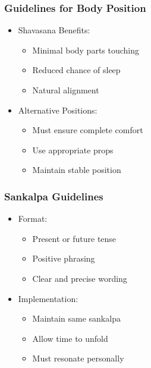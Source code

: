 \begin{frame}[fragile]\frametitle{Guidelines for Body Position}
    \begin{itemize}
        \item Shavasana Benefits:
            \begin{itemize}
                \item Minimal body parts touching
                \item Reduced chance of sleep
                \item Natural alignment
            \end{itemize}
        \item Alternative Positions:
            \begin{itemize}
                \item Must ensure complete comfort
                \item Use appropriate props
                \item Maintain stable position
            \end{itemize}
    \end{itemize}
\end{frame}

\begin{frame}[fragile]\frametitle{Sankalpa Guidelines}
    \begin{itemize}
        \item Format:
            \begin{itemize}
                \item Present or future tense
                \item Positive phrasing
                \item Clear and precise wording
            \end{itemize}
        \item Implementation:
            \begin{itemize}
                \item Maintain same sankalpa
                \item Allow time to unfold
                \item Must resonate personally
            \end{itemize}
    \end{itemize}
\end{frame}

